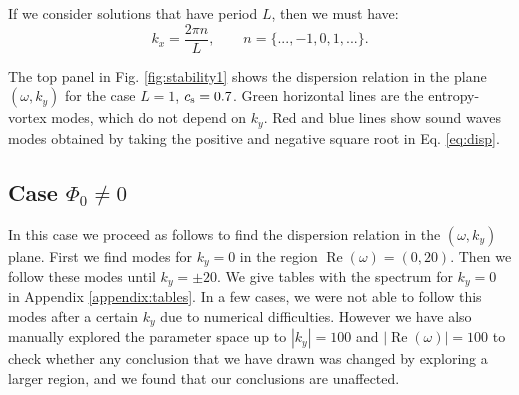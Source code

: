 \documentclass[useAMS,usenatbib]{mn2e}
\begin{document}
If we consider solutions that have period $L$, then we must have:
\begin{equation}
k_x = \frac{2 \pi n}{L},  \qquad n=\{...,-1,0,1,...\}.
\end{equation}

The top panel in Fig. \ref{fig:stability1} shows the dispersion relation in the plane $(\omega,k_y)$ for the case $L=1$, $c_{\rm s}=0.7$. Green horizontal lines are the entropy-vortex modes, which do not depend on $k_y$. Red and blue lines show sound waves modes obtained by taking the positive and negative square root in Eq. \eqref{eq:disp}.

\subsection{Case $\Phi_0\neq0$}

In this case we proceed as follows to find the dispersion relation in the $(\omega,k_y)$ plane. First we find modes for $k_y=0$ in the region $\operatorname{Re}(\omega)=(0,20)$. Then we follow these modes until $k_y=\pm 20$. We give tables with the spectrum for $k_y=0$ in Appendix \ref{appendix:tables}. In a few cases, we were not able to follow this modes after a certain $k_y$ due to numerical difficulties. However we have also manually explored the parameter space up to $|k_y|=100$ and $|\operatorname{Re}({\omega})|=100$ to check whether any conclusion that we have drawn was changed by exploring a larger region, and we found that our conclusions are unaffected. 
\end{document}
